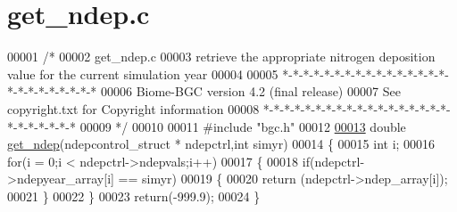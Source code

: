 \hypertarget{get__ndep_8c_source}{}\section{get\+\_\+ndep.\+c}
\label{get__ndep_8c_source}

\begin{DoxyCode}
00001 \textcolor{comment}{/* }
00002 \textcolor{comment}{get\_ndep.c}
00003 \textcolor{comment}{retrieve the appropriate nitrogen deposition value for the current simulation year}
00004 \textcolor{comment}{}
00005 \textcolor{comment}{*-*-*-*-*-*-*-*-*-*-*-*-*-*-*-*-*-*-*-*-*-*-*-*-*}
00006 \textcolor{comment}{Biome-BGC version 4.2 (final release)}
00007 \textcolor{comment}{See copyright.txt for Copyright information}
00008 \textcolor{comment}{*-*-*-*-*-*-*-*-*-*-*-*-*-*-*-*-*-*-*-*-*-*-*-*-*}
00009 \textcolor{comment}{*/}
00010 
00011 \textcolor{preprocessor}{#include "bgc.h"}
00012 
\hypertarget{get__ndep_8c_source_l00013}{}\hyperlink{get__ndep_8c_aca9b864bbce6d9c79e047c688ecdaf86}{00013} \textcolor{keywordtype}{double} \hyperlink{get__ndep_8c_aca9b864bbce6d9c79e047c688ecdaf86}{get\_ndep}(ndepcontrol\_struct * ndepctrl,\textcolor{keywordtype}{int} simyr)
00014 \{
00015     \textcolor{keywordtype}{int} i;
00016     \textcolor{keywordflow}{for}(i = 0;i < ndepctrl->ndepvals;i++)
00017     \{
00018         \textcolor{keywordflow}{if}(ndepctrl->ndepyear\_array[i] == simyr)
00019         \{
00020             \textcolor{keywordflow}{return} (ndepctrl->ndep\_array[i]);
00021         \}
00022     \}
00023     \textcolor{keywordflow}{return}(-999.9);
00024 \}
\end{DoxyCode}
